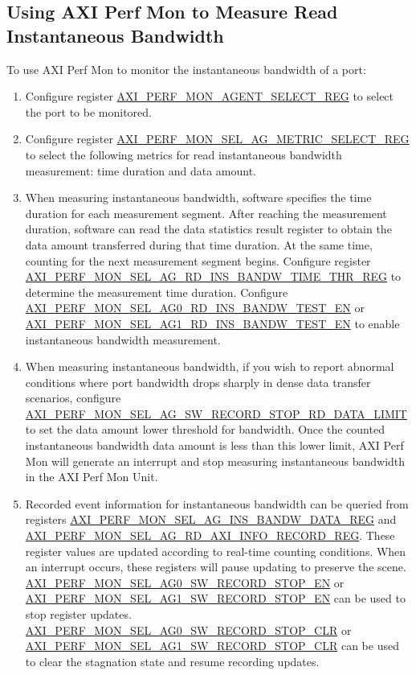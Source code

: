 \documentclass[main\_\_EN.tex]{subfiles}
\begin{document}
\subsection{Using AXI Perf Mon to Measure Read Instantaneous Bandwidth}
To use AXI Perf Mon to monitor the instantaneous bandwidth of a port:
\begin{enumerate}
    \item Configure register \hyperref[regdesc:AXIPERFMONAGENTSELECTREG]{AXI\_PERF\_MON\_AGENT\_SELECT\_REG} to select the port to be monitored.
    \item Configure register \hyperref[regdesc:AXIPERFMONSELAGNMETRICSELECTMREG]{AXI\_PERF\_MON\_SEL\_AG\_METRIC\_SELECT\_REG} to select the following metrics for read instantaneous bandwidth measurement: time duration and data amount.
    \item When measuring instantaneous bandwidth, software specifies the time duration for each measurement segment. After reaching the measurement duration, software can read the data statistics result register to obtain the data amount transferred during that time duration. At the same time, counting for the next measurement segment begins. Configure register \hyperref[regdesc:AXIPERFMONSELAGNINSBANDWTIMETHRREG]{AXI\_PERF\_MON\_SEL\_AG\_RD\_INS\_BANDW\_TIME\_THR\_REG} to determine the measurement time duration. Configure \hyperref[fielddesc:AXIPERFMONSELAG0RDINSBANDWTESTEN]{AXI\_PERF\_MON\_SEL\_AG0\_RD\_INS\_BANDW\_TEST\_EN} or \hyperref[fielddesc:AXIPERFMONSELAG1RDINSBANDWTESTEN]{AXI\_PERF\_MON\_SEL\_AG1\_RD\_INS\_BANDW\_TEST\_EN} to enable instantaneous bandwidth measurement.
    \item When measuring instantaneous bandwidth, if you wish to report abnormal conditions where port bandwidth drops sharply in dense data transfer scenarios, configure \hyperref[fielddesc:AXIPERFMONSELAGNSWRECORDSTOPRDDATALIMIT]{AXI\_PERF\_MON\_SEL\_AG\_SW\_RECORD\_STOP\_RD\_DATA\_LIMIT} to set the data amount lower threshold for bandwidth. Once the counted instantaneous bandwidth data amount is less than this lower limit, AXI Perf Mon will generate an interrupt and stop measuring instantaneous bandwidth in the AXI Perf Mon Unit.
    \item Recorded event information for instantaneous bandwidth can be queried from registers \hyperref[regdesc:AXIPERFMONSELAGNINSBANDWDATAMREG]{AXI\_PERF\_MON\_SEL\_AG\_INS\_BANDW\_DATA\_REG} and \hyperref[regdesc:AXIPERFMONSELAGNRDAXIINFORECORDMREG]{AXI\_PERF\_MON\_SEL\_AG\_RD\_AXI\_INFO\_RECORD\_REG}. These register values are updated according to real-time counting conditions. When an interrupt occurs, these registers will pause updating to preserve the scene. \hyperref[fielddesc:AXIPERFMONSELAG0SWRECORDSTOPEN]{AXI\_PERF\_MON\_SEL\_AG0\_SW\_RECORD\_STOP\_EN} or \hyperref[fielddesc:AXIPERFMONSELAG1SWRECORDSTOPEN]{AXI\_PERF\_MON\_SEL\_AG1\_SW\_RECORD\_STOP\_EN} can be used to stop register updates. \hyperref[fielddesc:AXIPERFMONSELAG0SWRECORDSTOPCLR]{AXI\_PERF\_MON\_SEL\_AG0\_SW\_RECORD\_STOP\_CLR} or \hyperref[fielddesc:AXIPERFMONSELAG1SWRECORDSTOPCLR]{AXI\_PERF\_MON\_SEL\_AG1\_SW\_RECORD\_STOP\_CLR} can be used to clear the stagnation state and resume recording updates.

\end{enumerate}
\end{document}
